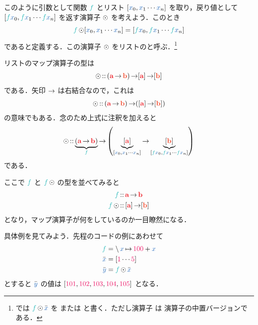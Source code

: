 \documentclass[a5paper,twoside,fleqn,draft]{jsbook}
\begin{document}
このように引数として関数 $\hFunc{f}$ とリスト $[\hVar{x}_0,\hVar{x}_1\dotsb \hVar{x}_n]$ を取り，戻り値として $[\hFunc{f}\hVar{x}_0,\hFunc{f}\hVar{x}_1\dotsb \hFunc{f}\hVar{x}_n]$ を返す演算子 $\operatorname{\odot}$ を考えよう．このとき
\begin{equation}
  \hFunc{f}\mMapList[\hVar{x}_0,\hVar{x}_1\dotsb \hVar{x}_n]
  =[\hFunc{f}\hVar{x}_0,\hFunc{f}\hVar{x}_1\dotsb \hFunc{f}\hVar{x}_n]
\end{equation}
であると定義する．この演算子 $\operatorname{\odot}$ をリストのと呼ぶ．\footnote{\haskell では $\hFunc{f}\mMapList\hListVarWith{x}$ を または  と書く．ただし演算子 \code{<\$>} は  演算子の中置バージョンである．}

リストのマップ演算子の型は
\begin{equation}
  \mMapList
  \hIsTypeOf{}(\hTypeName{a}\hFunctionArrow\mB)\hFunctionArrow\hListConstruct{\hTypeName{a}}\hFunctionArrow[\mB]
\end{equation}
である．矢印 $\operatorname{\rightarrow}$ は右結合なので，これは
\begin{equation}
  \mMapList
  \hIsTypeOf{}(\hTypeName{a}\hFunctionArrow\mB)\hFunctionArrow(\hListConstruct{\hTypeName{a}}\hFunctionArrow[\mB])
\end{equation}
の意味でもある．念のため上式に注釈を加えると
\begin{equation}
  \mMapList
  \hIsTypeOf\underbrace{\left(\hTypeName{a}\hFunctionArrow\hTypeName{b}\right)}_{\hFunc{f}}
  \hFunctionArrow\left(\underbrace{\hListConstruct{\hTypeName{a}}}_{[\hVar{x}_0,\hVar{x}_1\dotsb \hVar{x}_n]}
  \hFunctionArrow\underbrace{[\mB]}_{[\hFunc{f}\hVar{x}_0,\hFunc{f}\hVar{x}_1\dotsb \hFunc{f}\hVar{x}_n]}\right)
\end{equation}
である．

ここで $\hFunc{f}$ と $\hFunc{f}\mMapList$ の型を並べてみると
\begin{align}
  \hFunc{f}
  &\hIsTypeOf\hTypeName{a}\hFunctionArrow\hTypeName{b}\\
  \hFunc{f}\mMapList
  &\hIsTypeOf{}\hListConstruct{\hTypeName{a}}\hFunctionArrow[\mB]
\end{align}
となり，マップ演算子が何をしているのか一目瞭然になる．


具体例を見てみよう．先程の\python コードの例にあわせて
\begin{align}
  \hFunc{f}
  &=\mLambda\hVar{x}\mLambdaArrow\hConstant{100}+\hVar{x}\\
  \hListVarWith{x}
  &=[\hConstant{1}\dotsb\hConstant{5}]\\
  \hListVarWith{y}
  &=\hFunc{f}\mMapList\hListVarWith{x}
\end{align}
とすると $\hListVarWith{y}$ の値は $[\hConstant{101},\hConstant{102},\hConstant{103},\hConstant{104},\hConstant{105}]$ となる．
\end{document}
